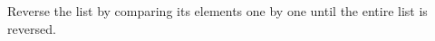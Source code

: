 \documentclass[preview]{standalone}
\begin{document}
Reverse the list by comparing its elements one by one until the entire list is reversed.\\
\end{document}
